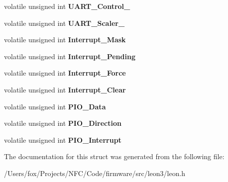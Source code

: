 \begin{DoxyCompactItemize}
\item 
\hypertarget{struct_l_e_o_n___register___map_aa5dbca83b252bea35f3138b792fb91ae}{
volatile unsigned int {\bfseries UART\_\-Control\_}}
\label{struct_l_e_o_n___register___map_aa5dbca83b252bea35f3138b792fb91ae}

\item 
\hypertarget{struct_l_e_o_n___register___map_a6ac19ea1e3747a7422f2c42191855e95}{
volatile unsigned int {\bfseries UART\_\-Scaler\_}}
\label{struct_l_e_o_n___register___map_a6ac19ea1e3747a7422f2c42191855e95}

\item 
\hypertarget{struct_l_e_o_n___register___map_a14ce3b72f7859c27ac1843e0fdb82d5a}{
volatile unsigned int {\bfseries Interrupt\_\-Mask}}
\label{struct_l_e_o_n___register___map_a14ce3b72f7859c27ac1843e0fdb82d5a}

\item 
\hypertarget{struct_l_e_o_n___register___map_ac80463420eeb3da1ca36205558001483}{
volatile unsigned int {\bfseries Interrupt\_\-Pending}}
\label{struct_l_e_o_n___register___map_ac80463420eeb3da1ca36205558001483}

\item 
\hypertarget{struct_l_e_o_n___register___map_acc3dfc7a29262b2712371d251f18e6ea}{
volatile unsigned int {\bfseries Interrupt\_\-Force}}
\label{struct_l_e_o_n___register___map_acc3dfc7a29262b2712371d251f18e6ea}

\item 
\hypertarget{struct_l_e_o_n___register___map_a5d7750b8553e6467a53436064d1f2b18}{
volatile unsigned int {\bfseries Interrupt\_\-Clear}}
\label{struct_l_e_o_n___register___map_a5d7750b8553e6467a53436064d1f2b18}

\item 
\hypertarget{struct_l_e_o_n___register___map_abcf70267ccdf99571342030e7a3627a2}{
volatile unsigned int {\bfseries PIO\_\-Data}}
\label{struct_l_e_o_n___register___map_abcf70267ccdf99571342030e7a3627a2}

\item 
\hypertarget{struct_l_e_o_n___register___map_a85fbe6544d1332ae1a4e71faa42f2069}{
volatile unsigned int {\bfseries PIO\_\-Direction}}
\label{struct_l_e_o_n___register___map_a85fbe6544d1332ae1a4e71faa42f2069}

\item 
\hypertarget{struct_l_e_o_n___register___map_a136c7e5c85e4c433b1caa29be4e51942}{
volatile unsigned int {\bfseries PIO\_\-Interrupt}}
\label{struct_l_e_o_n___register___map_a136c7e5c85e4c433b1caa29be4e51942}

\end{DoxyCompactItemize}


The documentation for this struct was generated from the following file:\begin{DoxyCompactItemize}
\item 
/Users/fox/Projects/NFC/Code/firmware/src/leon3/leon.h\end{DoxyCompactItemize}
